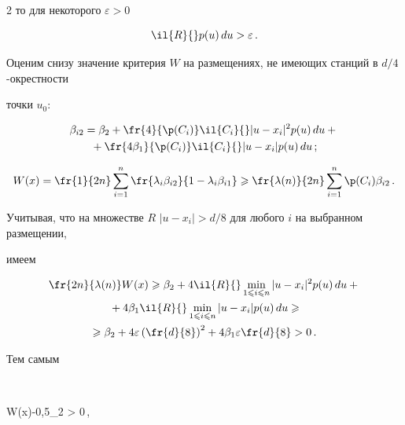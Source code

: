 \begin{multicols}{2}
то для некоторого $\varepsilon>0$


$$


\il{R}{}p(u)\,du > \varepsilon\,.


$$





Оценим снизу значение критерия $W$ на размещениях, не имеющих станций в $d/4$-окрестности


точки $u_0$:


\begin{multline*}


\beta_{i2}=\beta_2+\fr{4}{{\p} (C_i)}\il{C_i}{} |u-x_i|^2 p(u)\,du +{}\\


{}+ \fr{4 \beta_1}{{\p} (C_i)}\il{C_i}{} |u-x_i| p(u)\,du\,;


\end{multline*}





\noindent


$$


W(x)=\fr{1}{2n}\suml{i=1}{n}\fr{\lambda_i\beta_{i2}} {1-\lambda_i\beta_{i1}}


\geqslant \fr{\lambda(n)}{2n}\suml{i=1}{n} {\p} (C_i) \beta_{i2}\,.


$$


Учитывая, что на множестве $R$  $|u-x_i|> d/8$ для любого $i$ на выбранном размещении,


имеем


\begin{multline*}


\fr{2n}{\lambda(n)}W(x) \geqslant \beta_2 +


4 \il{R}{}\minl{1\leqslant i\leqslant


n}|u-x_i|^2 p(u)\,du +{}\\


{}+ 4 \beta_1 \il{R}{}\minl{1\leqslant i\leqslant n}|u-x_i| p(u)\,du


\geqslant


\\


\geqslant


 \beta_2+4\varepsilon\left (\fr{d}{8}\right )^2+4\beta_1\varepsilon\fr{d}{8} > 0\,.


\end{multline*}


Тем самым


$$


W(x)-0{,}5\beta_2 > 0\,,



\end{multicols}
